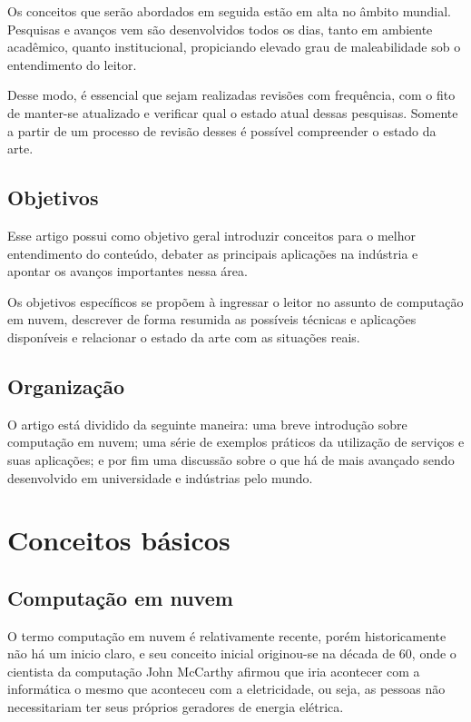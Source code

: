 \documentclass[12pt]{article}
\begin{document}
Os conceitos que serão abordados em seguida estão em alta no âmbito mundial. Pesquisas e avanços vem são desenvolvidos todos os dias, tanto em ambiente acadêmico, quanto institucional, propiciando elevado grau de maleabilidade sob o entendimento do leitor.

Desse modo, é essencial que sejam realizadas revisões com frequência, com o fito de manter-se atualizado e verificar qual o estado atual dessas pesquisas. Somente a partir de um processo de revisão desses é possível compreender o estado da arte.

\subsection{Objetivos}

Esse artigo possui como objetivo geral introduzir conceitos para o melhor entendimento do conteúdo, debater as principais aplicações na indústria e apontar os avanços importantes nessa área.

Os objetivos específicos se propõem à ingressar o leitor no assunto de computação em nuvem, descrever de forma resumida as possíveis técnicas e aplicações disponíveis e relacionar o estado da arte com as situações reais.

\subsection{Organização}

O artigo está dividido da seguinte maneira: uma breve introdução sobre computação em nuvem; uma série de exemplos práticos da utilização de serviços e suas aplicações; e por fim uma discussão sobre o que há de mais avançado sendo desenvolvido em universidade e indústrias pelo mundo.

\section{Conceitos básicos}

\subsection{Computação em nuvem}

O termo computação em nuvem é relativamente recente, porém historicamente não há um inicio claro, e seu conceito inicial originou-se na década de 60, onde o cientista da computação John McCarthy afirmou que iria acontecer com a informática o mesmo que aconteceu com a eletricidade, ou seja, as pessoas não necessitariam ter seus próprios geradores de energia elétrica.
\end{document}
